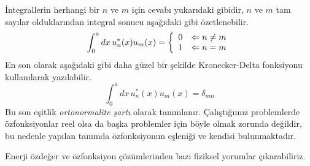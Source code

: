 \documentclass[00_kitap.tex]{subfiles}
\begin{document}
İntegrallerin herhangi bir $n$ ve $m$ için cevabı yukarıdaki gibidir, $n$ ve $m$ tam sayılar olduklarından integral sonucu aşağıdaki gibi özetlenebilir.
\begin{equation}
\int _ { 0 } ^ { a } d x \, u _ { n } ^ { * } ( x ) u _ { m } ( x )  = \left\{
\begin{array} { c l } 
{ 0 } & { \Leftarrow n \neq m } \\ 
{ 1 } & { \Leftarrow n = m} 
\end{array} 
\right.
\label{eq:orthonormality}
\end{equation}
En son olarak aşağıdaki gibi daha güzel bir şekilde Kronecker-Delta fonksiyonu kullanılarak yazılabilir.
\begin{equation}
\int _ { 0 } ^ { a }  d x \, u _ { n } ^ { * } ( x ) u _ { m } ( x ) = \delta _ { m n }
\end{equation}
Bu son eşitlik \emph{ortonormalite şartı} olarak tanımlanır. Çalıştığımız problemlerde özfonksiyonlar reel olsa da başka problemler için böyle olmak zorunda değildir, bu nedenle yapılan tanımda özfonksiyonun eşleniği ve kendisi bulunmaktadır.

Enerji özdeğer ve özfonksiyon çözümlerinden bazı fiziksel yorumlar çıkarabiliriz.
\end{document}
